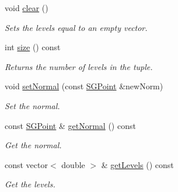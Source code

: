 \begin{DoxyCompactItemize}
\mbox{\label{classSGHyperplane_a38e2a9c26b1c58f8e0c585614f318628}} 
void \hyperlink{classSGHyperplane_a38e2a9c26b1c58f8e0c585614f318628}{clear} ()
\begin{DoxyCompactList}\small\item\em Sets the levels equal to an empty vector. \end{DoxyCompactList}\item 
\mbox{\label{classSGHyperplane_ab3e09fc609822cf940419acff48b0493}} 
int \hyperlink{classSGHyperplane_ab3e09fc609822cf940419acff48b0493}{size} () const
\begin{DoxyCompactList}\small\item\em Returns the number of levels in the tuple. \end{DoxyCompactList}\item 
\mbox{\label{classSGHyperplane_af6425968a114ae5b9f3716220a6a9f31}} 
void \hyperlink{classSGHyperplane_af6425968a114ae5b9f3716220a6a9f31}{set\+Normal} (const \hyperlink{classSGPoint}{S\+G\+Point} \&new\+Norm)
\begin{DoxyCompactList}\small\item\em Set the normal. \end{DoxyCompactList}\item 
\mbox{\label{classSGHyperplane_a380197ed5db29754ee75c7628aef53e5}} 
const \hyperlink{classSGPoint}{S\+G\+Point} \& \hyperlink{classSGHyperplane_a380197ed5db29754ee75c7628aef53e5}{get\+Normal} () const
\begin{DoxyCompactList}\small\item\em Get the normal. \end{DoxyCompactList}\item 
\mbox{\label{classSGHyperplane_af7232a6b42e6aec55e4a1cf93d9c9fd3}} 
const vector$<$ double $>$ \& \hyperlink{classSGHyperplane_af7232a6b42e6aec55e4a1cf93d9c9fd3}{get\+Levels} () const
\begin{DoxyCompactList}\small\item\em Get the levels. \end{DoxyCompactList}\item 
\mbox{\label{classSGHyperplane_a4a074f4db5c1b9440adfc6a26ef849ec}} 

\end{DoxyCompactItemize}
